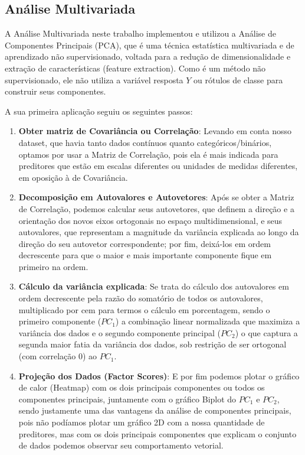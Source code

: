 \documentclass[conference]{IEEEtran}
\begin{document}
\subsection{Análise Multivariada}
A Análise Multivariada neste trabalho implementou e utilizou a Análise de Componentes Principais (PCA), que é uma técnica estatística multivariada e de aprendizado não supervisionado, voltada para a redução de dimensionalidade e extração de características (feature extraction). Como é um método não supervisionado, ele não utiliza a variável resposta $Y$ ou rótulos de classe para construir seus componentes. 

A sua primeira aplicação seguiu os seguintes passos:

\begin{enumerate}
  \item \textbf{Obter matriz de Covariância ou Correlação}: Levando em conta nosso dataset, que havia tanto dados contínuos quanto categóricos/binários, optamos por usar a Matriz de Correlação, pois ela é mais indicada para preditores que estão em escalas diferentes ou unidades de medidas diferentes, em oposição à de Covariância.

  \item \textbf{Decomposição em Autovalores e Autovetores}: Após se obter a Matriz de Correlação, podemos calcular seus autovetores, que definem a direção e a orientação dos novos eixos ortogonais no espaço multidimensional, e seus autovalores, que representam a magnitude da variância explicada ao longo da direção do seu autovetor correspondente; por fim, deixá-los em ordem decrescente para que o maior e mais importante componente fique em primeiro na ordem.

  \item \textbf{Cálculo da variância explicada}: Se trata do cálculo dos autovalores em ordem decrescente pela razão do somatório de todos os autovalores, multiplicado por cem para termos o cálculo em porcentagem, sendo o primeiro componente ($PC_1$) a combinação linear normalizada que maximiza a variância dos dados e o segundo componente principal ($PC_2$) o que captura a segunda maior fatia da variância dos dados, sob restrição de ser ortogonal (com correlação 0) ao $PC_1$.

  \item \textbf{Projeção dos Dados (Factor Scores)}: E por fim podemos plotar o gráfico de calor (Heatmap) com os dois principais componentes ou todos os componentes principais, juntamente com o gráfico Biplot do $PC_1$ e $PC_2$, sendo justamente uma das vantagens da análise de componentes principais, pois não podíamos plotar um gráfico 2D com a nossa quantidade de preditores, mas com os dois principais componentes que explicam o conjunto de dados podemos observar seu comportamento vetorial.

\end{enumerate}
\end{document}
